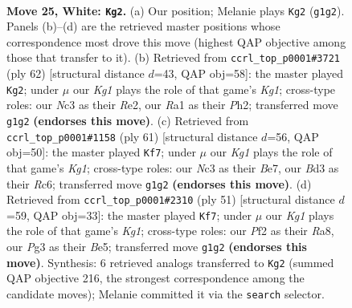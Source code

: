 \documentclass[11pt]{article}
\begin{document}
\clearpage

\begin{figure}[p]\centering
\begin{subfigure}{0.46\textwidth}\centering
\resizebox{\linewidth}{!}{%
\newchessgame
\chessboard[
  setfen={rnb5/4k3/1p2p3/p3Pp2/P5r1/1PNB2P1/5P2/R2R2K1 w - f6 0 25},
  showmover=false,
  pgfstyle=straightmove, color=movearrow, markmove={g1-g2}
]}
\caption{}
\end{subfigure}\hfill
\begin{subfigure}{0.46\textwidth}\centering
\resizebox{\linewidth}{!}{%
\newchessgame
\chessboard[
  setfen={2b2k2/1p2r2p/r3P1p1/3p1pP1/p2N4/P2P4/1P2R2P/4R1K1 w - - 3 32},
  showmover=false,
  pgfstyle=straightmove, color=movearrow, markmove={g1-g2}
]}
\caption{}
\end{subfigure}
\\[4pt]
\begin{subfigure}{0.46\textwidth}\centering
\resizebox{\linewidth}{!}{%
\newchessgame
\chessboard[
  setfen={2r3k1/4b1pp/p1rp4/3Rp2P/4P3/BP3P2/2P1R3/1K6 b - - 0 31},
  showmover=false,
  pgfstyle=straightmove, color=movearrow, markmove={g8-f7}
]}
\caption{}
\end{subfigure}\hfill
\begin{subfigure}{0.46\textwidth}\centering
\resizebox{\linewidth}{!}{%
\newchessgame
\chessboard[
  setfen={r1r3k1/p3p3/5pp1/R3b3/NP4p1/3R2P1/P4P1P/6K1 b - - 0 26},
  showmover=false,
  pgfstyle=straightmove, color=movearrow, markmove={g8-f7}
]}
\caption{}
\end{subfigure}
\caption{\textbf{Move 25, White: \texttt{Kg2}.} (a) Our position; Melanie plays \texttt{Kg2} (\texttt{g1g2}). Panels (b)--(d) are the retrieved master positions whose correspondence most drove this move (highest QAP objective among those that transfer to it). (b) Retrieved from \texttt{ccrl\_top\_p0001\#3721} (ply 62) [structural distance $d$=43, QAP obj=58]: the master played \texttt{Kg2}; under $\mu$ our \emph{Kg1} plays the role of that game's \emph{Kg1}; cross-type roles: our \emph{N}c3 as their \emph{R}e2, our \emph{R}a1 as their \emph{P}h2; transferred move \texttt{g1g2} \textbf{(endorses this move)}. (c) Retrieved from \texttt{ccrl\_top\_p0001\#1158} (ply 61) [structural distance $d$=56, QAP obj=50]: the master played \texttt{Kf7}; under $\mu$ our \emph{Kg1} plays the role of that game's \emph{Kg1}; cross-type roles: our \emph{N}c3 as their \emph{B}e7, our \emph{B}d3 as their \emph{R}c6; transferred move \texttt{g1g2} \textbf{(endorses this move)}. (d) Retrieved from \texttt{ccrl\_top\_p0001\#2310} (ply 51) [structural distance $d$=59, QAP obj=33]: the master played \texttt{Kf7}; under $\mu$ our \emph{Kg1} plays the role of that game's \emph{Kg1}; cross-type roles: our \emph{P}f2 as their \emph{R}a8, our \emph{P}g3 as their \emph{B}e5; transferred move \texttt{g1g2} \textbf{(endorses this move)}. Synthesis: 6 retrieved analogs transferred to \texttt{Kg2} (summed QAP objective 216, the strongest correspondence among the candidate moves); Melanie committed it via the \texttt{search} selector.}
\label{fig:thought-m48}
\end{figure}
\end{document}

